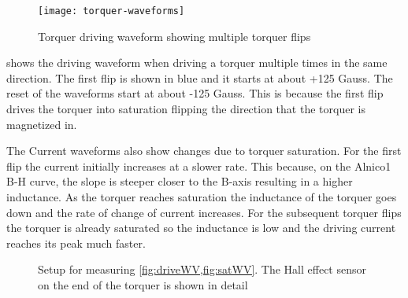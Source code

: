 \begin{figure}[H]
    \centering
    \texttt{[image: torquer-waveforms]}
    \caption{Torquer driving waveform showing multiple torquer flips}
    \label{fig:driveWV}
\end{figure}

 shows the driving waveform when driving a torquer multiple times in the same direction. The first flip is shown in blue and it starts at about +125 Gauss. The reset of the waveforms start at about -125 Gauss. This is because the first flip drives the torquer into saturation flipping the direction that the torquer is magnetized in.

The Current waveforms also show changes due to torquer saturation. For the first flip the current initially increases at a slower rate. This because, on the Alnico1 B-H curve, the slope is steeper closer to the B-axis resulting in a higher inductance. As the torquer reaches saturation the inductance of the torquer goes down and the rate of change of current increases. For the subsequent torquer flips the torquer is already saturated so the inductance is low and the driving current reaches its peak much faster.

\begin{figure}[H]
    \centering
    \caption{Setup for measuring \cref{fig:driveWV,fig:satWV}. The Hall effect sensor on the end of the torquer is shown in detail}
    \label{fig:WVsetup}
\end{figure}

